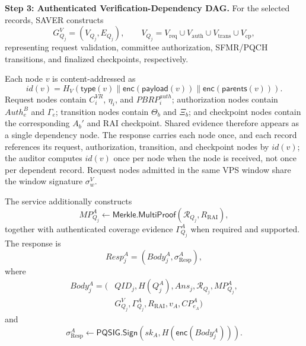 \documentclass[lettersize,journal]{IEEEtran}
\begin{document}
\medskip
\noindent\textbf{Step 3: Authenticated Verification-Dependency DAG.}
For the selected records, SAVER constructs
\begin{equation}
G_{Q_j}^{V}=(V_{Q_j},E_{Q_j}),
\qquad
V_{Q_j}
=
V_{\mathrm{req}}\cup V_{\mathrm{auth}}
\cup V_{\mathrm{trans}}\cup V_{\mathrm{cp}},
\end{equation}
representing request validation, committee authorization, SFMR/PQCH
transitions, and finalized checkpoints, respectively.

Each node $v$ is content-addressed as
\begin{equation}
id(v)=
H_V(
\mathsf{type}(v)\parallel
\mathsf{enc}(\mathsf{payload}(v))\parallel
\mathsf{enc}(\mathsf{parents}(v))).
\end{equation}
Request nodes contain $C_i^{VR}$, $\eta_i$, and
$PBRP_i^{auth}$; authorization nodes contain $Auth_e^B$ and
$\Gamma_e$; transition nodes contain $\Theta_b$ and $\Xi_b$; and
checkpoint nodes contain the corresponding $A_b'$ and RAI checkpoint.
Shared evidence therefore appears as a single dependency node.
\textcolor{e3}{The response carries each node once, and each record
references its request, authorization, transition, and checkpoint nodes
by $id(v)$; the auditor computes $id(v)$ once per node when the node is
received, not once per dependent record.} \textcolor{e2}{Request nodes admitted in the
same VPS window share the window signature $\sigma_w^{V}$.}

The service additionally constructs
\begin{equation}
MP_{Q_j}^A
\leftarrow
\mathsf{Merkle.MultiProof}
(\mathcal{R}_{Q_j},R_{\mathrm{RAI}}),
\end{equation}
together with authenticated coverage evidence $\Gamma_{Q_j}^A$ when
required and supported. The response is
\begin{equation}
Resp_j^A=(Body_j^A,\sigma_{\mathrm{Resp}}^A),
\end{equation}
where
\begin{equation}
\begin{aligned}
Body_j^A=\big(
&QID_j,H(Q_j^A),Ans_j,\mathcal{R}_{Q_j},MP_{Q_j}^A,\\
&G_{Q_j}^{V},\Gamma_{Q_j}^{A},
R_{\mathrm{RAI}},v_A,CP_{e_A}^A\big)
\end{aligned}
\end{equation}
and
\begin{equation}
\sigma_{\mathrm{Resp}}^A
\leftarrow
\mathsf{PQSIG.Sign}
(sk_A,H(\mathsf{enc}(Body_j^A))).
\end{equation}
\end{document}
